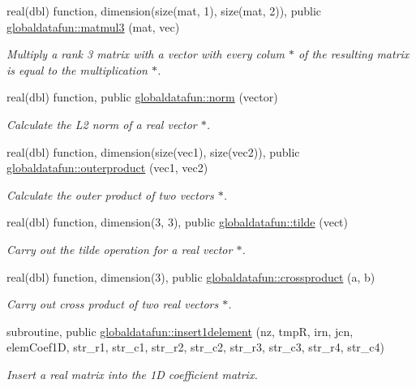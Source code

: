 \begin{DoxyCompactItemize}
real(dbl) function, dimension(size(mat, 1), size(mat, 2)), public \hyperlink{namespaceglobaldatafun_a562042b12250dbd7e3ef3a24d9f93a53}{globaldatafun\+::matmul3} (mat, vec)
\begin{DoxyCompactList}\small\item\em Multiply a rank 3 matrix with a vector with every colum $\ast$ of the resulting matrix is equal to the multiplication $\ast$. \end{DoxyCompactList}\item 
real(dbl) function, public \hyperlink{namespaceglobaldatafun_a79010ea3a4434936e8a71182e62b6e48}{globaldatafun\+::norm} (vector)
\begin{DoxyCompactList}\small\item\em Calculate the L2 norm of a real vector $\ast$. \end{DoxyCompactList}\item 
real(dbl) function, dimension(size(vec1), size(vec2)), public \hyperlink{namespaceglobaldatafun_af49b8ee04a8cfd5d42b863a092e17e91}{globaldatafun\+::outerproduct} (vec1, vec2)
\begin{DoxyCompactList}\small\item\em Calculate the outer product of two vectors $\ast$. \end{DoxyCompactList}\item 
real(dbl) function, dimension(3, 3), public \hyperlink{namespaceglobaldatafun_aabcfb273a99323881aa160da1f44a561}{globaldatafun\+::tilde} (vect)
\begin{DoxyCompactList}\small\item\em Carry out the tilde operation for a real vector $\ast$. \end{DoxyCompactList}\item 
real(dbl) function, dimension(3), public \hyperlink{namespaceglobaldatafun_a5b4feec69bb3f3464bcd8c08406f9c82}{globaldatafun\+::crossproduct} (a, b)
\begin{DoxyCompactList}\small\item\em Carry out cross product of two real vectors $\ast$. \end{DoxyCompactList}\item 
subroutine, public \hyperlink{namespaceglobaldatafun_a8ea8d9cf6c54128f3e5df19d4d0170da}{globaldatafun\+::insert1delement} (nz, tmpR, irn, jcn, elem\+Coef1D, str\+\_\+r1, str\+\_\+c1, str\+\_\+r2, str\+\_\+c2, str\+\_\+r3, str\+\_\+c3, str\+\_\+r4, str\+\_\+c4)
\begin{DoxyCompactList}\small\item\em Insert a real matrix into the 1D coefficient matrix. \end{DoxyCompactList}\item 

\end{DoxyCompactItemize}
